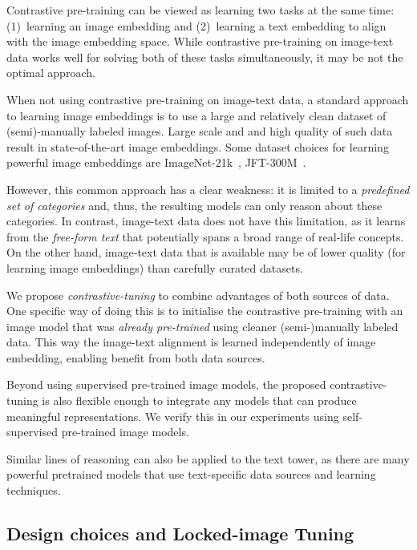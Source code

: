 \documentclass[10pt,twocolumn,letterpaper]{article}
\begin{document}
Contrastive pre-training can be viewed as learning two tasks at the same time: (1)~learning an image embedding and (2)~learning a text embedding to align with the image embedding space. While contrastive pre-training on image-text data works well for solving both of these tasks simultaneously, it may be not the optimal approach.

When not using contrastive pre-training on image-text data, a standard approach to learning image embeddings is to use a large and relatively clean dataset of (semi)-manually labeled images. Large scale and and high quality of such data result in state-of-the-art image embeddings. Some dataset choices for learning powerful image embeddings are ImageNet-21k~\cite{imagenet}, JFT-300M~\cite{unreasonable_effectiveness_of_data}. 

However, this common approach has a clear weakness: it is limited to a \textit{predefined set of categories} and, thus, the resulting models can only reason about these categories. In contrast, image-text data does not have this limitation, as it learns from the \textit{free-form text} that potentially spans a broad range of real-life concepts. On the other hand, image-text data that is available may be of lower quality (for learning image embeddings) than carefully curated datasets.

We propose \textit{contrastive-tuning} to combine advantages of both sources of data. One specific way of doing this is to initialise the contrastive pre-training with an image model that was \textit{already pre-trained} using cleaner \mbox{(semi-)}manually labeled data. This way the image-text alignment is learned independently of image embedding, enabling benefit from both data sources. 

Beyond using supervised pre-trained image models, the proposed contrastive-tuning is also flexible enough to integrate any models that can produce meaningful representations. We verify this in our experiments using self-supervised pre-trained image models.

Similar lines of reasoning can also be applied to the text tower, as there are many powerful pretrained models that use text-specific data sources and learning techniques. 



\subsection{Design choices and Locked-image Tuning}
\label{sec:contrastive_design}
\end{document}
